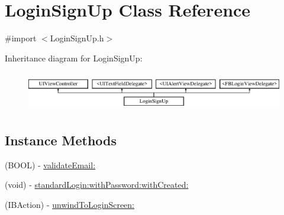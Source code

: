 \hypertarget{interface_login_sign_up}{\section{Login\+Sign\+Up Class Reference}
\label{interface_login_sign_up}
}


{\ttfamily \#import $<$Login\+Sign\+Up.\+h$>$}

Inheritance diagram for Login\+Sign\+Up\+:\begin{figure}[H]
\begin{center}
\leavevmode
\includegraphics[height=1.761006cm]{interface_login_sign_up}
\end{center}
\end{figure}
\subsection*{Instance Methods}
\begin{DoxyCompactItemize}
\item 
(B\+O\+O\+L) -\/ \hyperlink{interface_login_sign_up_ae3df154525f230ce1e5575d2d10840e2}{validate\+Email\+:}
\item 
(void) -\/ \hyperlink{interface_login_sign_up_a9f5f1dbe36810fd050c96b99935940b4}{standard\+Login\+:with\+Password\+:with\+Created\+:}
\item 
(I\+B\+Action) -\/ \hyperlink{interface_login_sign_up_a3edc0364b4ae4e6a47e798593ebea03d}{unwind\+To\+Login\+Screen\+:}
\end{DoxyCompactItemize}
